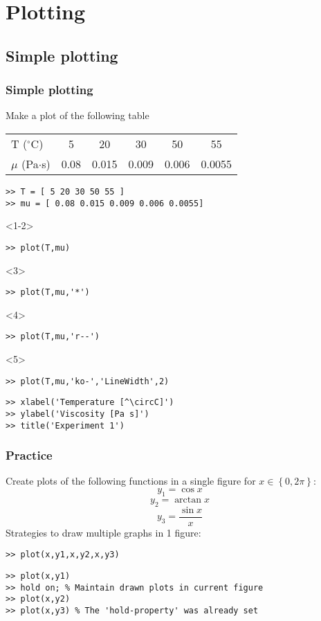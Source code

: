 \section{Plotting}
\subsection*{Simple plotting}
\begin{frame}[fragile]
  \frametitle{Simple plotting}
  Make a plot of the following table
   \begin{longtable}{l!{\vrule}ccccc}
      T ($^\circ$C) & 5   &  20  & 30   & 50   & 55 \\
      $\mu$ (Pa$\cdot$s)  & 0.08& 0.015& 0.009& 0.006& 0.0055 \\
    \end{longtable} \pause
  \begin{lstlisting}
>> T = [ 5 20 30 50 55 ]
>> mu = [ 0.08 0.015 0.009 0.006 0.0055]
\end{lstlisting}
\begin{onlyenv}<1-2>
  \begin{lstlisting}
>> plot(T,mu)
  \end{lstlisting}
\end{onlyenv}
\begin{onlyenv}<3>
  \begin{lstlisting}
>> plot(T,mu,'*')
  \end{lstlisting}
\end{onlyenv}
\begin{onlyenv}<4>
  \begin{lstlisting}
>> plot(T,mu,'r--')
  \end{lstlisting}
\end{onlyenv}
\begin{onlyenv}<5>
  \begin{lstlisting}
>> plot(T,mu,'ko-','LineWidth',2)
  \end{lstlisting}
\end{onlyenv}
\begin{lstlisting}
>> xlabel('Temperature [^\circC]')
>> ylabel('Viscosity [Pa s]')
>> title('Experiment 1')
  \end{lstlisting}
\end{frame}

\begin{frame}[fragile]
 \frametitle{Practice}
 Create plots of the following functions in a single figure for $x \in \left\{0,2\pi\right\}$:
  \[
    y_1 = \cos x 
  \]
  \[
    y_2 = \arctan x 
  \]
  \[
    y_3 = \frac{\sin x }{x}
  \]
  \pause
  Strategies to draw multiple graphs in 1 figure:
 \begin{lstlisting}
>> plot(x,y1,x,y2,x,y3)
 \end{lstlisting}
  \begin{lstlisting}
>> plot(x,y1)
>> hold on; % Maintain drawn plots in current figure
>> plot(x,y2)
>> plot(x,y3) % The 'hold-property' was already set
  \end{lstlisting}
\end{frame}

